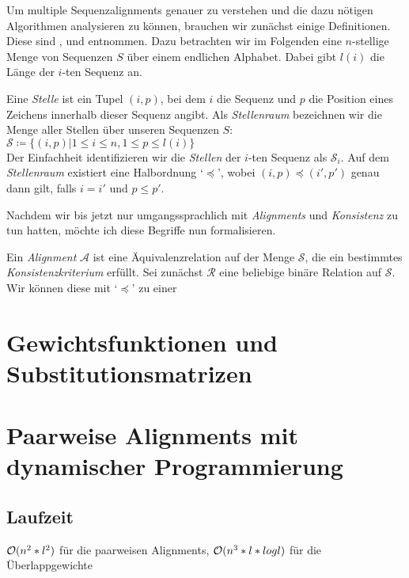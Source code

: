 Um multiple Sequenzalignments genauer zu verstehen und die dazu nötigen Algorithmen analysieren zu können, brauchen wir zunächst einige Definitionen. Diese sind \citet{mdw96}, \citet{am00} und \citet{cpm10} entnommen. Dazu betrachten wir im Folgenden eine $n$-stellige Menge von Sequenzen $S$ über einem endlichen Alphabet. Dabei gibt $l(i)$ die Länge der $i$-ten Sequenz an.

\begin{definition}
	Eine \emph{Stelle} ist ein Tupel $(i,p)$, bei dem $i$ die Sequenz und $p$ die Position eines Zeichens innerhalb dieser Sequenz angibt. Als \emph{Stellenraum} bezeichnen wir die Menge aller Stellen über unseren Sequenzen $S$: $\mathcal{S} \coloneqq \{(i,p)|1 \leq i \leq n, 1 \leq p \leq l(i) \}$ \\
	Der Einfachheit identifizieren wir die \emph{Stellen} der $i$-ten Sequenz als $\mathcal{S}_i$. Auf dem \emph{Stellenraum} existiert eine Halbordnung `$\preceq$', wobei $(i,p) \preceq (i',p')$ genau dann gilt, falls $i=i'$ und $p\leq p'$.
\end{definition}

Nachdem wir bis jetzt nur umgangssprachlich mit \emph{Alignments} und \emph{Konsistenz} zu tun hatten, möchte ich diese Begriffe nun formalisieren.

\begin{definition}
	Ein \emph{Alignment} $\mathcal{A}$ ist eine Äquivalenzrelation auf der Menge $\mathcal{S}$, die ein bestimmtes \emph{Konsistenzkriterium} erfüllt. Sei zunächst $\mathcal{R}$ eine beliebige binäre Relation auf $\mathcal{S}$. Wir können diese mit `$\preceq$' zu einer 
\end{definition}

\section{Gewichtsfunktionen und Substitutionsmatrizen}

\section{Paarweise Alignments mit dynamischer Programmierung}

\subsection{Laufzeit}
$\mathcal{O}(n^2*l^2)$ für die paarweisen Alignments, $\mathcal{O}(n^3*l*log l)$ für die Überlappgewichte

